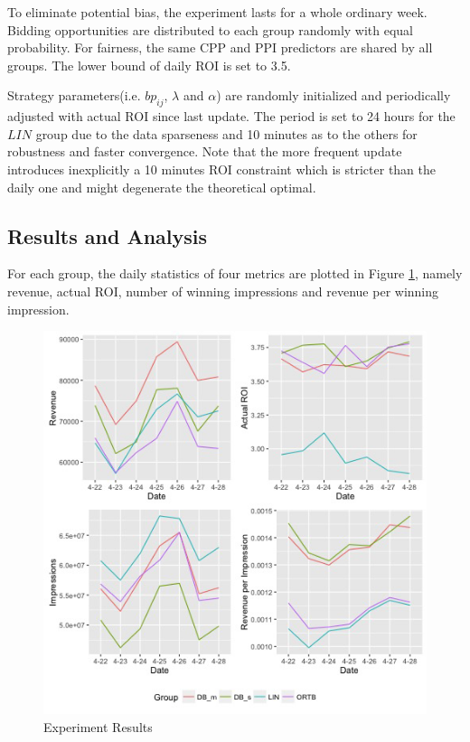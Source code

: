 \documentclass{article}
\newcommand{\sbp}{bp_{ij}}
\begin{document}
To eliminate potential bias, the experiment lasts for a whole ordinary week.
Bidding opportunities are distributed to each group randomly with equal probability.
For fairness, the same CPP and PPI predictors are shared by all groups.
The lower bound of daily ROI is set to 3.5.

Strategy parameters(i.e. $\sbp$, $\lambda$ and $\alpha$) are randomly initialized and
    periodically adjusted with actual ROI since last update.
The period is set to 24 hours for the $LIN$ group due to the data sparseness
    and 10 minutes as to the others for robustness and faster convergence.
Note that the more frequent update introduces inexplicitly a 10 minutes ROI constraint
    which is stricter than the daily one and might degenerate the theoretical optimal.

\subsection{Results and Analysis}

For each group, the daily statistics of four metrics are plotted in Figure \ref{Result},
    namely revenue, actual ROI, number of winning impressions and revenue per winning impression.

\begin{figure}[!h]
\centering
\includegraphics[width=1.0\linewidth]{./Result.jpg}
\caption{Experiment Results\label{Result}}
\end{figure}
\end{document}
